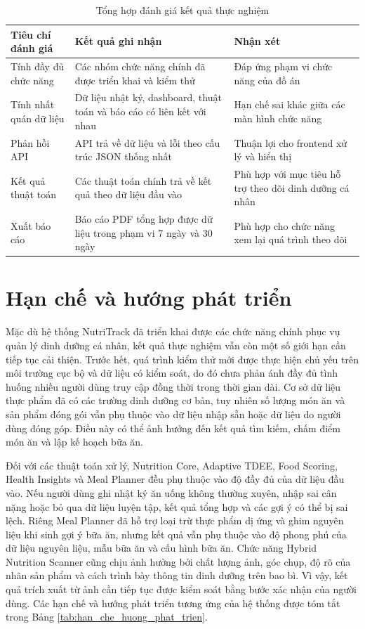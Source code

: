 \documentclass[12pt, a4paper]{report}
\begin{document}
\begin{table}[htbp]
\centering
\caption{Tổng hợp đánh giá kết quả thực nghiệm}
\label{tab:tong_hop_danh_gia}
\begin{tabular}{|>{\raggedright\arraybackslash}p{4cm}|>{\raggedright\arraybackslash}p{4cm}|p{7cm}|}
\hline
\textbf{Tiêu chí đánh giá} & \textbf{Kết quả ghi nhận} & \textbf{Nhận xét} \\
\hline
Tính đầy đủ chức năng & Các nhóm chức năng chính đã được triển khai và kiểm thử & Đáp ứng phạm vi chức năng của đồ án \\
\hline
Tính nhất quán dữ liệu & Dữ liệu nhật ký, dashboard, thuật toán và báo cáo có liên kết với nhau & Hạn chế sai khác giữa các màn hình chức năng \\
\hline
Phản hồi API & API trả về dữ liệu và lỗi theo cấu trúc JSON thống nhất & Thuận lợi cho frontend xử lý và hiển thị \\
\hline
Kết quả thuật toán & Các thuật toán chính trả về kết quả theo dữ liệu đầu vào & Phù hợp với mục tiêu hỗ trợ theo dõi dinh dưỡng cá nhân \\
\hline
Xuất báo cáo & Báo cáo PDF tổng hợp được dữ liệu trong phạm vi 7 ngày và 30 ngày & Phù hợp cho chức năng xem lại quá trình theo dõi \\
\hline
\end{tabular}
\end{table}

\section{Hạn chế và hướng phát triển}Mặc dù hệ thống NutriTrack đã triển khai được các chức năng chính phục vụ quản lý dinh dưỡng cá nhân, kết quả thực nghiệm vẫn còn một số giới hạn cần tiếp tục cải thiện. Trước hết, quá trình kiểm thử mới được thực hiện chủ yếu trên môi trường cục bộ và dữ liệu có kiểm soát, do đó chưa phản ánh đầy đủ tình huống nhiều người dùng truy cập đồng thời trong thời gian dài. Cơ sở dữ liệu thực phẩm đã có các trường dinh dưỡng cơ bản, tuy nhiên số lượng món ăn và sản phẩm đóng gói vẫn phụ thuộc vào dữ liệu nhập sẵn hoặc dữ liệu do người dùng đóng góp. Điều này có thể ảnh hưởng đến kết quả tìm kiếm, chấm điểm món ăn và lập kế hoạch bữa ăn.

Đối với các thuật toán xử lý, Nutrition Core, Adaptive TDEE, Food Scoring, Health Insights và Meal Planner đều phụ thuộc vào độ đầy đủ của dữ liệu đầu vào. Nếu người dùng ghi nhật ký ăn uống không thường xuyên, nhập sai cân nặng hoặc bỏ qua dữ liệu luyện tập, kết quả tổng hợp và các gợi ý có thể bị sai lệch. Riêng Meal Planner đã hỗ trợ loại trừ thực phẩm dị ứng và ghim nguyên liệu khi sinh gợi ý bữa ăn, nhưng kết quả vẫn phụ thuộc vào độ phong phú của dữ liệu nguyên liệu, mẫu bữa ăn và cấu hình bữa ăn. Chức năng Hybrid Nutrition Scanner cũng chịu ảnh hưởng bởi chất lượng ảnh, góc chụp, độ rõ của nhãn sản phẩm và cách trình bày thông tin dinh dưỡng trên bao bì. Vì vậy, kết quả trích xuất từ ảnh cần tiếp tục được kiểm soát bằng bước xác nhận của người dùng. Các hạn chế và hướng phát triển tương ứng của hệ thống được tóm tắt trong Bảng \ref{tab:han_che_huong_phat_trien}.
\end{document}
